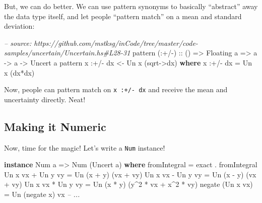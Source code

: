 \documentclass[]{article}
\newenvironment{Shaded}{}{}
\newcommand{\KeywordTok}[1]{\textcolor[rgb]{0.00,0.44,0.13}{\textbf{{#1}}}}
\newcommand{\DataTypeTok}[1]{\textcolor[rgb]{0.56,0.13,0.00}{{#1}}}
\newcommand{\DecValTok}[1]{\textcolor[rgb]{0.25,0.63,0.44}{{#1}}}
\newcommand{\CommentTok}[1]{\textcolor[rgb]{0.38,0.63,0.69}{\textit{{#1}}}}
\newcommand{\OtherTok}[1]{\textcolor[rgb]{0.00,0.44,0.13}{{#1}}}
\newcommand{\FunctionTok}[1]{\textcolor[rgb]{0.02,0.16,0.49}{{#1}}}
\newcommand{\NormalTok}[1]{{#1}}
\begin{document}
But, we can do better. We can use pattern synonyms to basically
``abstract'' away the data type itself, and let people ``pattern match''
on a mean and standard deviation:

\begin{Shaded}
\begin{Highlighting}[]
\CommentTok{-- source: https://github.com/mstksg/inCode/tree/master/code-samples/uncertain/Uncertain.hs#L28-31}
\NormalTok{pattern}\OtherTok{ (:+/-) ::} \NormalTok{() }\OtherTok{=>} \DataTypeTok{Floating} \NormalTok{a }\OtherTok{=>} \NormalTok{a }\OtherTok{->} \NormalTok{a }\OtherTok{->} \DataTypeTok{Uncert} \NormalTok{a}
\NormalTok{pattern x }\FunctionTok{:+/-} \NormalTok{dx }\OtherTok{<-} \DataTypeTok{Un} \NormalTok{x (sqrt}\OtherTok{->}\NormalTok{dx)}
  \KeywordTok{where}
    \NormalTok{x }\FunctionTok{:+/-} \NormalTok{dx }\FunctionTok{=} \DataTypeTok{Un} \NormalTok{x (dx}\FunctionTok{*}\NormalTok{dx)}
\end{Highlighting}
\end{Shaded}

Now, people can pattern match on \texttt{x\ :+/-\ dx} and receive the
mean and uncertainty directly. Neat!

\subsection{Making it Numeric}\label{making-it-numeric}

Now, time for the magic! Let's write a \texttt{Num} instance!

\begin{Shaded}
\begin{Highlighting}[]
\KeywordTok{instance} \DataTypeTok{Num} \NormalTok{a }\OtherTok{=>} \DataTypeTok{Num} \NormalTok{(}\DataTypeTok{Uncert} \NormalTok{a) }\KeywordTok{where}
    \NormalTok{fromIntegral      }\FunctionTok{=} \NormalTok{exact }\FunctionTok{.} \NormalTok{fromIntegral}
    \DataTypeTok{Un} \NormalTok{x vx }\FunctionTok{+} \DataTypeTok{Un} \NormalTok{y vy }\FunctionTok{=} \DataTypeTok{Un} \NormalTok{(x }\FunctionTok{+} \NormalTok{y)    (vx }\FunctionTok{+} \NormalTok{vy)}
    \DataTypeTok{Un} \NormalTok{x vx }\FunctionTok{-} \DataTypeTok{Un} \NormalTok{y vy }\FunctionTok{=} \DataTypeTok{Un} \NormalTok{(x }\FunctionTok{-} \NormalTok{y)    (vx }\FunctionTok{+} \NormalTok{vy)}
    \DataTypeTok{Un} \NormalTok{x vx }\FunctionTok{*} \DataTypeTok{Un} \NormalTok{y vy }\FunctionTok{=} \DataTypeTok{Un} \NormalTok{(x }\FunctionTok{*} \NormalTok{y)    (y}\FunctionTok{^}\DecValTok{2} \FunctionTok{*} \NormalTok{vx }\FunctionTok{+} \NormalTok{x}\FunctionTok{^}\DecValTok{2} \FunctionTok{*} \NormalTok{vy)}
    \NormalTok{negate (}\DataTypeTok{Un} \NormalTok{x vx)  }\FunctionTok{=} \DataTypeTok{Un} \NormalTok{(negate x) vx}
    \CommentTok{-- ...}
\end{Highlighting}
\end{Shaded}
\end{document}
